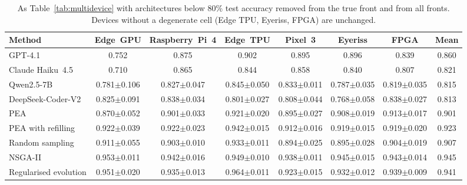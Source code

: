 \documentclass[preprint,12pt]{elsarticle}
\begin{document}
\begin{table}[h]\centering\footnotesize
\caption{As Table~\ref{tab:multidevice} with architectures below 80\% test accuracy removed from the true front and from all fronts. Devices without a degenerate cell (Edge TPU, Eyeriss, FPGA) are unchanged.}\label{tab:multidevicefloor}
\setlength{\tabcolsep}{2.5pt}
\begin{adjustbox}{max width=\linewidth}
\begin{tabular}{lccccccc}
\toprule
Method & Edge~GPU & Raspberry~Pi~4 & Edge~TPU & Pixel~3 & Eyeriss & FPGA & Mean \\
\midrule
GPT-4.1 & 0.752 & 0.875 & 0.902 & 0.895 & 0.896 & 0.839 & 0.860 \\
Claude Haiku~4.5 & 0.710 & 0.865 & 0.844 & 0.858 & 0.840 & 0.807 & 0.821 \\
Qwen2.5-7B & 0.781$\pm$0.106 & 0.827$\pm$0.047 & 0.845$\pm$0.050 & 0.833$\pm$0.011 & 0.787$\pm$0.035 & 0.819$\pm$0.035 & 0.815 \\
DeepSeek-Coder-V2 & 0.825$\pm$0.091 & 0.838$\pm$0.034 & 0.801$\pm$0.027 & 0.808$\pm$0.044 & 0.768$\pm$0.058 & 0.838$\pm$0.027 & 0.813 \\
\midrule
PEA & 0.870$\pm$0.052 & 0.901$\pm$0.033 & 0.921$\pm$0.020 & 0.895$\pm$0.027 & 0.908$\pm$0.019 & 0.913$\pm$0.017 & 0.901 \\
PEA with refilling & 0.922$\pm$0.039 & 0.922$\pm$0.023 & 0.942$\pm$0.015 & 0.912$\pm$0.016 & 0.919$\pm$0.015 & 0.919$\pm$0.020 & 0.923 \\
Random sampling & 0.911$\pm$0.055 & 0.903$\pm$0.010 & 0.933$\pm$0.011 & 0.894$\pm$0.025 & 0.895$\pm$0.028 & 0.904$\pm$0.019 & 0.907 \\
NSGA-II & 0.953$\pm$0.011 & 0.942$\pm$0.016 & 0.949$\pm$0.010 & 0.938$\pm$0.011 & 0.945$\pm$0.015 & 0.943$\pm$0.014 & 0.945 \\
Regularised evolution & 0.951$\pm$0.020 & 0.935$\pm$0.013 & 0.964$\pm$0.011 & 0.923$\pm$0.015 & 0.932$\pm$0.012 & 0.939$\pm$0.009 & 0.941 \\
\bottomrule
\end{tabular}
\end{adjustbox}
\end{table}
\end{document}
